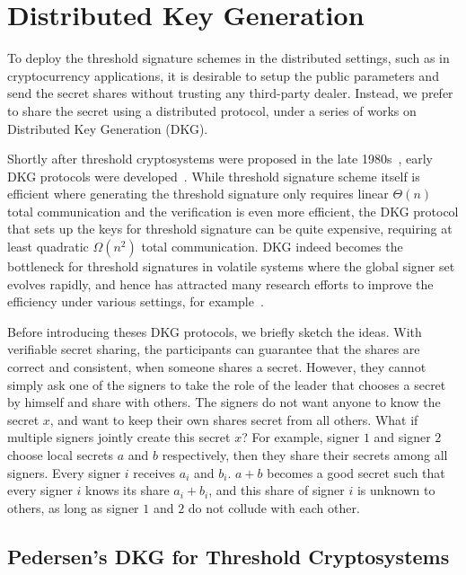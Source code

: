 \section{Distributed Key Generation} \label{sec:dkg}

To deploy the threshold signature schemes in the distributed settings, such as in cryptocurrency applications, it is desirable to setup the public parameters and send the secret shares without trusting any third-party dealer. Instead, we prefer to share the secret using a distributed protocol, under a series of works on Distributed Key Generation (DKG). 

Shortly after threshold cryptosystems were proposed in the late 1980s~\cite{DBLP:conf/crypto/DesmedtF89}, early DKG protocols were developed~\cite{DBLP:conf/eurocrypt/Pedersen91a}. While threshold signature scheme itself is efficient where generating the threshold signature only requires linear $\Theta(n)$ total communication and the verification is even more efficient, the DKG protocol that sets up the keys for threshold signature can be quite expensive, requiring at least quadratic $\Omega(n^2)$ total communication. DKG indeed becomes the bottleneck for threshold signatures in volatile systems where the global signer set evolves rapidly, and hence has attracted many research efforts to improve the efficiency under various settings, for example~\cite{DBLP:conf/sp/DasYXMK022,DBLP:conf/uss/DasXK023}. 

Before introducing theses DKG protocols, we briefly sketch the ideas. With verifiable secret sharing, the participants can guarantee that the shares are correct and consistent, when someone shares a secret. However, they cannot simply ask one of the signers to take the role of the leader that chooses a secret by himself and share with others. The signers do not want anyone to know the secret $x$, and want to keep their own shares secret from all others. What if multiple signers jointly create this secret $x$? For example, signer $1$ and signer $2$ choose local secrets $a$ and $b$ respectively, then they share their secrets among all signers. Every signer $i$ receives $a_i$ and $b_i$. $a+b$ becomes a good secret such that every signer $i$ knows its share $a_i+b_i$, and this share of signer $i$ is unknown to others, as long as signer $1$ and $2$ do not collude with each other. 

\subsection{Pedersen's DKG for Threshold Cryptosystems}

